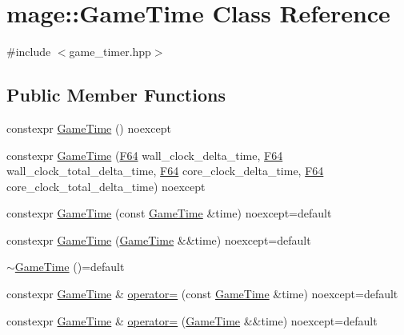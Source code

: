 \hypertarget{classmage_1_1_game_time}{}\section{mage\+:\+:Game\+Time Class Reference}
\label{classmage_1_1_game_time}


{\ttfamily \#include $<$game\+\_\+timer.\+hpp$>$}

\subsection*{Public Member Functions}
\begin{DoxyCompactItemize}
\item 
constexpr \mbox{\hyperlink{classmage_1_1_game_time_af39a4fbd42467249874ba9372f463552}{Game\+Time}} () noexcept
\item 
constexpr \mbox{\hyperlink{classmage_1_1_game_time_aaee30f360c0ae8383a16f908fe3abe78}{Game\+Time}} (\mbox{\hyperlink{namespacemage_ad26233bbec640deda836e572c1a23708}{F64}} wall\+\_\+clock\+\_\+delta\+\_\+time, \mbox{\hyperlink{namespacemage_ad26233bbec640deda836e572c1a23708}{F64}} wall\+\_\+clock\+\_\+total\+\_\+delta\+\_\+time, \mbox{\hyperlink{namespacemage_ad26233bbec640deda836e572c1a23708}{F64}} core\+\_\+clock\+\_\+delta\+\_\+time, \mbox{\hyperlink{namespacemage_ad26233bbec640deda836e572c1a23708}{F64}} core\+\_\+clock\+\_\+total\+\_\+delta\+\_\+time) noexcept
\item 
constexpr \mbox{\hyperlink{classmage_1_1_game_time_a7af065c229b72b1daa5a8f6cc6553ede}{Game\+Time}} (const \mbox{\hyperlink{classmage_1_1_game_time}{Game\+Time}} \&time) noexcept=default
\item 
constexpr \mbox{\hyperlink{classmage_1_1_game_time_a87dd026fe0c83aee86c39e4c40e641fb}{Game\+Time}} (\mbox{\hyperlink{classmage_1_1_game_time}{Game\+Time}} \&\&time) noexcept=default
\item 
\mbox{\hyperlink{classmage_1_1_game_time_ae7a709bde27a737be9ebed2a92e00c8b}{$\sim$\+Game\+Time}} ()=default
\item 
constexpr \mbox{\hyperlink{classmage_1_1_game_time}{Game\+Time}} \& \mbox{\hyperlink{classmage_1_1_game_time_a7ebc520cb69228e457c24958e7b97baa}{operator=}} (const \mbox{\hyperlink{classmage_1_1_game_time}{Game\+Time}} \&time) noexcept=default
\item 
constexpr \mbox{\hyperlink{classmage_1_1_game_time}{Game\+Time}} \& \mbox{\hyperlink{classmage_1_1_game_time_a79756019f21b5125114483ddc71247fe}{operator=}} (\mbox{\hyperlink{classmage_1_1_game_time}{Game\+Time}} \&\&time) noexcept=default

\end{DoxyCompactItemize}
